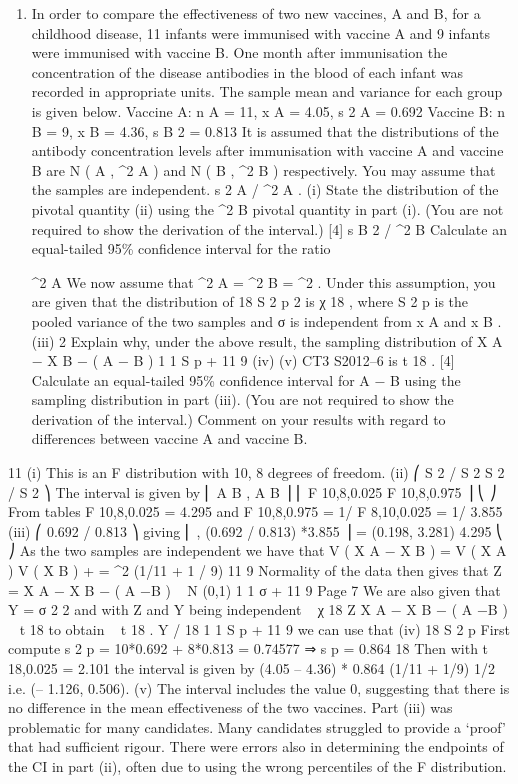 \documentclass[a4paper,12pt]{article}
\begin{document}
\begin{enumerate}
\item 
In order to compare the effectiveness of two new vaccines, A and B, for a childhood
disease, 11 infants were immunised with vaccine A and 9 infants were immunised
with vaccine B. One month after immunisation the concentration of the disease
antibodies in the blood of each infant was recorded in appropriate units. The sample
mean and variance for each group is given below.
Vaccine A: n A = 11, x A = 4.05, s 2 A = 0.692
Vaccine B: n B = 9, x B = 4.36, s B 2 = 0.813
It is assumed that the distributions of the antibody concentration levels after
immunisation with vaccine A and vaccine B are N ( \mu A , \sigma^2 A ) and N ( \mu B , \sigma^2 B )
respectively. You may assume that the samples are independent.
s 2 A / \sigma^2 A
.
(i) State the distribution of the pivotal quantity
(ii) using the
\sigma^2 B
pivotal quantity in part (i). (You are not required to show the derivation of the
interval.)
[4]
s B 2 / \sigma^2 B
Calculate an equal-tailed 95\% confidence interval for the ratio

\sigma^2 A
We now assume that \sigma^2 A = \sigma^2 B = \sigma^2 . Under this assumption, you are given that the
distribution of
18 S 2 p
2
is χ 18
, where S 2 p is the pooled variance of the two samples and
σ
is independent from x A and x B .
(iii)
2
Explain why, under the above result, the sampling distribution of
X A − X B − ( \mu A − \mu B )
1 1
S p
+
11 9
(iv)
(v)
CT3 S2012–6
is t 18 . [4]
Calculate an equal-tailed 95\% confidence interval for \mu A − \mu B using the
sampling distribution in part (iii). (You are not required to show the
derivation of the interval.) 
Comment on your results with regard to differences between vaccine A and
vaccine B.
\end{enumerate}
\newpage

11
(i) This is an F distribution with 10, 8 degrees of freedom.
(ii) ⎛ S 2 / S 2
S 2 / S 2 ⎞
The interval is given by ⎜ A B , A B ⎟
⎜ F 10,8,0.025 F 10,8,0.975 ⎟
⎝
⎠
From tables F 10,8,0.025 = 4.295 and F 10,8,0.975 = 1/ F 8,10,0.025 = 1/ 3.855
(iii)
⎛ 0.692 / 0.813
⎞
giving ⎜
, (0.692 / 0.813) *3.855 ⎟ = (0.198, 3.281)
4.295
⎝
⎠
As the two samples are independent we have that
V ( X A − X B ) =
V ( X A ) V ( X B )
+
= \sigma^2 (1/11 + 1 / 9)
11
9
Normality of the data then gives that Z =
X A − X B − ( \mu A −\mu B )
~ N (0,1)
1 1
σ
+
11 9
Page 7%
We are also given that Y =
σ
2
2
and with Z and Y being independent
~ χ 18
Z
X A − X B − ( \mu A −\mu B )
~ t 18 to obtain
~ t 18 .
Y / 18
1 1
S p
+
11 9
we can use that
(iv)
18 S 2 p
First compute s 2 p =
10*0.692 + 8*0.813
= 0.74577 ⇒ s p = 0.864
18
Then with t 18,0.025 = 2.101 the interval is given by (4.05 – 4.36)  *
0.864 (1/11 + 1/9) 1/2 i.e. (– 1.126, 0.506).
(v)
The interval includes the value 0, suggesting that there is no difference in the
mean effectiveness of the two vaccines.
Part (iii) was problematic for many candidates. Many candidates struggled to provide a
‘proof’ that had sufficient rigour. There were errors also in determining the endpoints of the
CI in part (ii), often due to using the wrong percentiles of the F distribution.
\end{document}
